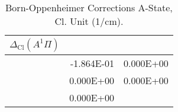\begin{table}[h]
\begin{tabular}{crr}
\toprule
$\Delta_\textrm{Cl} (A^1\Pi)$\\ \midrule 
& -1.864E-01 & 0.000E+00 \\
& 0.000E+00 & 0.000E+00 \\
& 0.000E+00 \\
\bottomrule
\end{tabular}\caption{Born-Oppenheimer Corrections A-State, Cl. Unit (1/cm).}\end{table}
